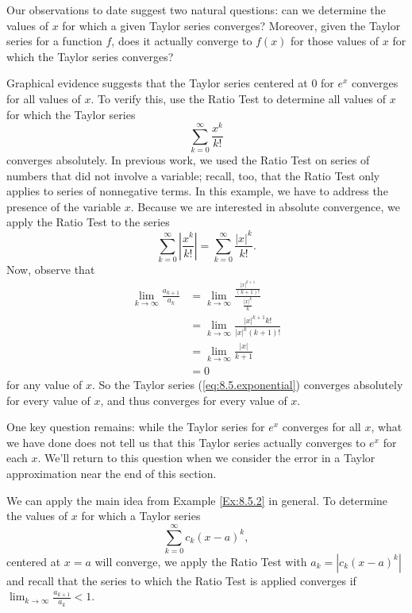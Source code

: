 Our observations to date suggest two natural questions: can we determine the values of $x$ for which a given Taylor series converges? Moreover, given the Taylor series for a function $f$, does it actually converge to $f(x)$ for those values of $x$ for which the Taylor series converges? 

\bex \label{Ex:8.5.2} Graphical evidence suggests that the Taylor series centered at 0 for $e^x$ converges for all values of $x$. To verify this, use the Ratio Test to determine all values of $x$ for which the Taylor series
\begin{equation} \label{eq:8.5.exponential}
\sum_{k=0}^{\infty} \frac{x^k}{k!}
\end{equation}
converges absolutely.
\eex
In previous work, we used the Ratio Test on series of numbers that did not involve a variable; recall, too, that the Ratio Test only applies to series of nonnegative terms.  In this example, we have to address  the presence of the variable $x$.  Because we are interested in absolute convergence, we apply the Ratio Test to the series
\[\sum_{k=0}^{\infty} \left| \frac{x^k}{k!} \right| = \sum_{k=0}^{\infty} \frac{| x |^k}{k!}.\]
Now, observe that
\begin{align*}
\lim_{k \to \infty} \frac{a_{k+1}}{a_k}   & = \lim_{k \to \infty} \frac{\frac{| x |^{k+1}}{(k+1)!} }{ \frac{| x |^k}{k} }  \\
    &= \lim_{k \to \infty} \frac{| x |^{k+1}k!}{ | x |^{k}(k+1)! } \\
    &= \lim_{k \to \infty} \frac{| x |}{k+1} \\
    &= 0
\end{align*}
for any value of $x$. So the Taylor series (\ref{eq:8.5.exponential}) converges absolutely for every value of $x$, and thus converges for every value of $x$. 

\afterex

One key question remains: while the Taylor series for $e^x$ converges for all $x$, what we have done does not tell us that this Taylor series actually converges to $e^x$ for each $x$. We'll return to this question when we consider the error in a Taylor approximation near the end of this section.

We can apply the main idea from Example \ref{Ex:8.5.2} in general. To determine the values of $x$ for which a Taylor series
\[\sum_{k=0}^{\infty} c_k (x-a)^k,\]
centered at $x = a$  will converge, we apply the Ratio Test with $a_k = | c_k (x-a)^k |$ and recall that the series to which the Ratio Test is applied converges if $\lim_{k \to \infty} \frac{a_{k+1}}{a_k} < 1$. 

